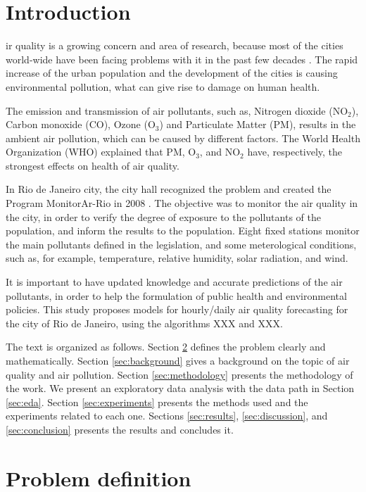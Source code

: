 \section{Introduction}
\label{sec:introduction}

ir quality is a growing concern and area
of research, because most of the cities world-wide have been facing problems with it in
the past few decades \cite{mayer1999}. The rapid increase of the urban
population and the development of the cities is causing environmental
pollution, what can give rise to damage on human health. 

The emission and
transmission of air pollutants, such as, Nitrogen dioxide (NO$_2$), Carbon
monoxide (CO), Ozone (O$_3$)
and Particulate Matter (PM), results in the ambient air pollution, which can be
caused by different factors. The World Health
Organization (WHO) explained \cite{who2006} that PM, O$_3$, and NO$_2$ have, respectively, the
strongest effects on health of air quality. 

In Rio de Janeiro city, the city hall recognized the problem and created the
Program MonitorAr-Rio in 2008 \cite{relatorio2011}. The objective was to
monitor the air quality in the city, in order to verify the degree of exposure
to the pollutants of the population, and inform the results to the population.
Eight fixed stations monitor the main pollutants defined in the legislation,
and some meterological conditions, such as, for example, temperature, relative
humidity, solar radiation, and wind. 

It is important to have updated knowledge and accurate predictions of the
air pollutants, in order to help the formulation of public health and
environmental policies. This study proposes models for hourly/daily air
quality forecasting for the city of Rio de Janeiro, using the algorithms XXX
and XXX. 

The text is organized as follows. Section \ref{sec:problem-definition} defines
the problem clearly and mathematically. Section \ref{sec:background} gives a
background on the topic of air quality and air pollution. Section \ref{sec:methodology} presents
the methodology of the work. We present an exploratory data analysis with the
data path in Section \ref{sec:eda}. Section \ref{sec:experiments} presents the
methods used and the experiments related to each one. Sections
\ref{sec:results}, \ref{sec:discussion}, and \ref{sec:conclusion} presents the
results and concludes it. 


\section{Problem definition}
\label{sec:problem-definition}

